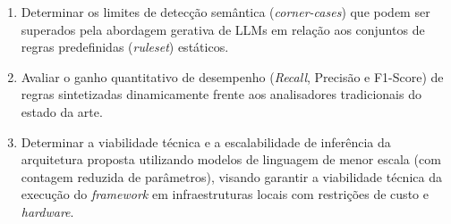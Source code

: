 \documentclass[
    12pt,                %
    openright,           %
    oneside,             %
    a4paper,             %
    english,             %
    brazil               %
]{abntex2}
\begin{document}
\begin{enumerate}
  \item Determinar os limites de detecção semântica (\textit{corner-cases}) que podem ser superados pela abordagem gerativa de LLMs em relação aos conjuntos de regras predefinidas (\textit{ruleset}) estáticos.
  \item Avaliar o ganho quantitativo de desempenho (\textit{Recall}, Precisão e F1-Score) de regras sintetizadas dinamicamente frente aos analisadores tradicionais do estado da arte.
  \item Determinar a viabilidade técnica e a escalabilidade de inferência da arquitetura proposta utilizando modelos de linguagem de menor escala (com contagem reduzida de parâmetros), visando garantir a viabilidade técnica da execução do \textit{framework} em infraestruturas locais com restrições de custo e \textit{hardware}.
\end{enumerate}
\end{document}
